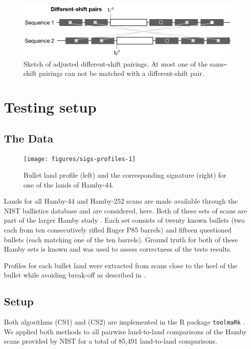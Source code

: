 \documentclass[12pt]{article}
\begin{document}
\begin{figure}[hbtp]
\centering
\includegraphics[width=.7\textwidth]{images/sketch-diff-2.png}
\caption{\label{sketch-diff-2}Sketch of adjusted different-shift pairings. At most one of the same-shift pairings can not be matched with a different-shift pair. }
\end{figure}

\section{Testing setup}\label{testing-setup}

\subsection{The Data}\label{the-data}

\begin{figure}

{\centering \texttt{[image: figures/sigs-profiles-1]} 

}

\caption{Bullet land profile (left) and the corresponding signature (right) for one of the lands of Hamby-44.}\label{fig:sigs-profiles}
\end{figure}

Lands for all Hamby-44 and Hamby-252 scans are made available through
the NIST ballistics database \citep{nist} and are considered, here. Both
of these sets of scans are part of the larger Hamby study \citep{hamby}.
Each set consists of twenty known bullets (two each from ten
consecutively rifled Ruger P85 barrels) and fifteen questioned bullets
(each matching one of the ten barrels). Ground truth for both of these
Hamby sets is known and was used to assess correctness of the tests
results.

Profiles for each bullet land were extracted from scans close to the
heel of the bullet while avoiding break-off as described in
\citet{aoas}.

\subsection{Setup}\label{setup}

Both algorithms (CS1) and (CS2) are implemented in the R package
\texttt{toolmaRk} \citep{toolmark}. We applied both methods to all
pairwise land-to-land comparisons of the Hamby scans provided by NIST
for a total of 85,491 land-to-land comparisons.
\end{document}
